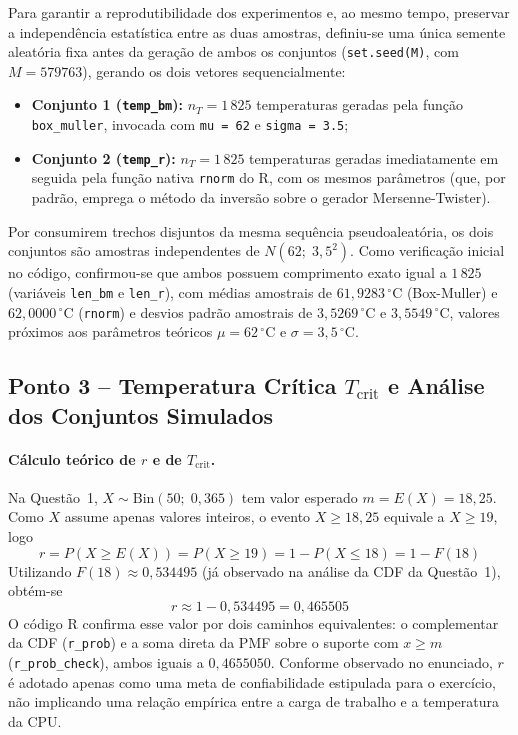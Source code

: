\documentclass[10pt,a4paper]{article}
\begin{document}
Para garantir a reprodutibilidade dos experimentos e, ao mesmo tempo, preservar a independência estatística entre as duas amostras, definiu-se uma única semente aleatória fixa antes da geração de ambos os conjuntos (\texttt{set.seed(M)}, com $M = 579763$), gerando os dois vetores sequencialmente:
\begin{itemize}
    \item \textbf{Conjunto 1 (\texttt{temp\_bm}):} $n_T = 1\,825$ temperaturas geradas pela função \texttt{box\_muller}, invocada com \texttt{mu = 62} e \texttt{sigma = 3.5};
    \item \textbf{Conjunto 2 (\texttt{temp\_r}):} $n_T = 1\,825$ temperaturas geradas imediatamente em seguida pela função nativa \texttt{rnorm} do R, com os mesmos parâmetros (que, por padrão, emprega o método da inversão sobre o gerador Mersenne-Twister).
\end{itemize}

Por consumirem trechos disjuntos da mesma sequência pseudoaleatória, os dois conjuntos são amostras independentes de $N(62;\; 3{,}5^{2})$. Como verificação inicial no código, confirmou-se que ambos possuem comprimento exato igual a $1\,825$ (variáveis \texttt{len\_bm} e \texttt{len\_r}), com médias amostrais de $61{,}9283\,^\circ\text{C}$ (Box-Muller) e $62{,}0000\,^\circ\text{C}$ (\texttt{rnorm}) e desvios padrão amostrais de $3{,}5269\,^\circ\text{C}$ e $3{,}5549\,^\circ\text{C}$, valores próximos aos parâmetros teóricos $\mu = 62\,^\circ\text{C}$ e $\sigma = 3{,}5\,^\circ\text{C}$.

\subsection{Ponto 3 -- Temperatura Crítica $T_{\text{crit}}$ e Análise dos Conjuntos Simulados}

\paragraph{Cálculo teórico de $r$ e de $T_{\text{crit}}$.} Na Questão~1, $X \sim \text{Bin}(50;\; 0{,}365)$ tem valor esperado $m = E(X) = 18{,}25$. Como $X$ assume apenas valores inteiros, o evento $X \ge 18{,}25$ equivale a $X \ge 19$, logo
\[
r = P(X \ge E(X)) = P(X \ge 19) = 1 - P(X \le 18) = 1 - F(18)
\]
Utilizando $F(18) \approx 0{,}534495$ (já observado na análise da CDF da Questão~1), obtém-se
\[
\boxed{r \approx 1 - 0{,}534495 = 0{,}465505}
\]
O código R confirma esse valor por dois caminhos equivalentes: o complementar da CDF (\texttt{r\_prob}) e a soma direta da PMF sobre o suporte com $x \ge m$ (\texttt{r\_prob\_check}), ambos iguais a $0{,}4655050$. Conforme observado no enunciado, $r$ é adotado apenas como uma meta de confiabilidade estipulada para o exercício, não implicando uma relação empírica entre a carga de trabalho e a temperatura da CPU.
\end{document}
